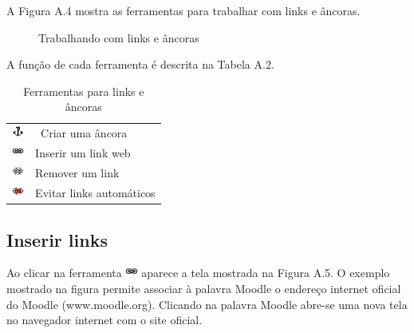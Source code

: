 
A Figura A.4 mostra as ferramentas para trabalhar com links e âncoras.

\begin{figure}
 \begin{center}
  \caption{Trabalhando com links e âncoras}
 \end{center}
\end{figure}

A função de cada ferramenta é descrita na Tabela A.2.

\begin{table}
\begin{center}
 \begin{tabular}{m{0.5cm} m{4.0cm}} \\
  \includegraphics[width=0.4cm]{imagem/cap0/anchor.jpg} & \ Criar uma âncora \\
  \includegraphics[width=0.4cm]{imagem/cap0/link.jpg} & Inserir um link web \\
  \includegraphics[width=0.4cm]{imagem/cap0/unlink.jpg} & Remover um link \\
  \includegraphics[width=0.4cm]{imagem/cap0/nolink.jpg} & Evitar links automáticos \\  \hline
 \end{tabular}
\caption{Ferramentas para links e âncoras}
\end{center}
\end{table}

\subsection{Inserir links}

Ao clicar na ferramenta \includegraphics[width=0.4cm]{imagem/cap0/link.jpg} aparece a tela mostrada na Figura A.5. O exemplo mostrado na figura permite associar à palavra Moodle o endereço internet oficial do Moodle (www.moodle.org). Clicando na palavra Moodle abre-se uma nova tela no navegador internet com o site oficial.


